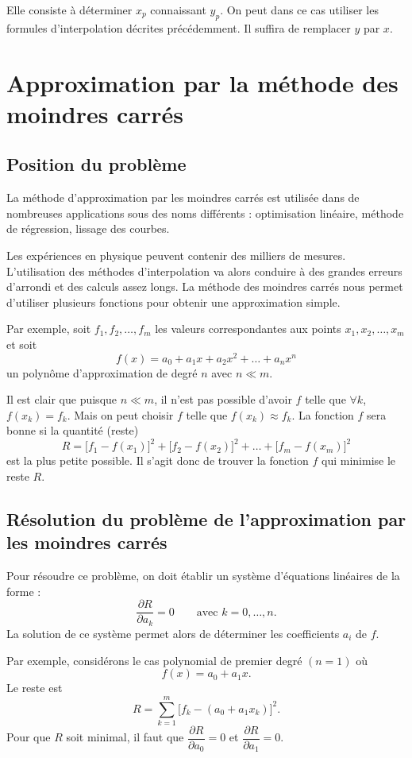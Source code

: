 Elle consiste à déterminer $x_p$ connaissant $y_p$. On peut dans ce cas
utiliser les formules d'interpolation décrites précédemment. Il suffira de
remplacer $y$ par $x$.

\section{Approximation par la méthode des moindres carrés}

\subsection{Position du problème}

La méthode d'approximation par les moindres carrés est utilisée dans de
nombreuses applications sous des noms différents : optimisation linéaire,
méthode de régression, lissage des courbes.

Les expériences en physique peuvent contenir des milliers de mesures.
L'utilisation des méthodes d'interpolation va alors conduire à des grandes
erreurs d'arrondi et des calculs assez longs. La méthode des moindres carrés
nous permet d'utiliser plusieurs fonctions pour obtenir une approximation
simple.

Par exemple, soit $f_1, f_2, \dots, f_m$ les valeurs correspondantes aux
points $x_1, x_2, \dots, x_m$ et soit
\[
  f(x) = a_0 + a_1x + a_2x^2 + \dots + a_nx^n
\]
un polynôme d'approximation de degré $n$ avec $n \ll m$.

Il est clair que puisque $n \ll m$, il n'est pas possible d'avoir $f$ telle
que $\forall k$, $f(x_k) = f_k$. Mais on peut choisir $f$ telle que
$f(x_k) \approx f_k$. La fonction $f$ sera bonne si la quantité (reste)
\[
  R = \bigl[f_1 - f(x_1)\bigr]^2 + \bigl[f_2 - f(x_2)\bigr]^2 + \dots
      + \bigl[f_m - f(x_m)\bigr]^2
\]
est la plus petite possible. Il s'agit donc de trouver la fonction $f$ qui
minimise le reste $R$.

\subsection{Résolution du problème de l'approximation par les moindres
carrés}

Pour résoudre ce problème, on doit établir un système d'équations linéaires de
la forme :
\[
  \frac{\partial R}{\partial a_k} = 0 \qquad\text{avec } k = 0, \dots, n .
\]
La solution de ce système permet alors de déterminer les coefficients $a_i$
de $f$.

Par exemple, considérons le cas polynomial de premier degré $(n = 1)$ où
\[
  f(x) = a_0 + a_1x .
\]
Le reste est
\[
  R = \sum_{k=1}^{m}\bigl[f_k - (a_0 + a_1x_k)\bigr]^2 .
\]
Pour que $R$ soit minimal, il faut que
$\dfrac{\partial R}{\partial a_0} = 0$ et
$\dfrac{\partial R}{\partial a_1} = 0$.

